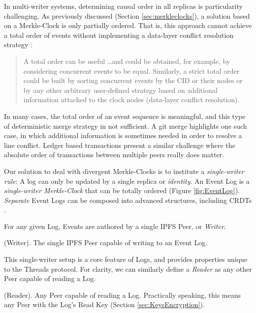 \documentclass{textile}
\begin{document}
In multi-writer systems, determining causal order in all replicas is particularity challenging. As previously discussed (Section \ref{sec:merkleclocks}), a solution based on a Merkle-Clock is only partially ordered. That is, this approach cannot achieve a total order of events without implementing a data-layer conflict resolution strategy \cite{sanjuanMerkleCRDTs2019}:

\begin{quote}
A total order can be useful \dots and could be obtained, for example, by considering concurrent events to be equal. Similarly, a strict total order could be built by sorting concurrent events by the CID or their nodes or by any other arbitrary user-defined strategy based on additional information attached to the clock nodes (data-layer conflict resolution).
\end{quote}

In many cases, the total order of an event sequence is meaningful, and this type of deterministic merge strategy in not sufficient. A git merge highlights one such case, in which additional information is sometimes needed in order to resolve a line conflict. Ledger based transactions present a similar challenge where the absolute order of transactions between multiple peers really does matter.

Our solution to deal with divergent Merkle-Clocks is to institute a \emph{single-writer rule}: A log can only be updated by a single replica or \emph{identity}. An Event Log is a \emph{single-writer Merkle-Clock} that can be totally ordered (Figure \ref{fig:EventLog}). \emph{Separate} Event Logs can be composed into advanced structures, including CRDTs \cite{enesSingleWriterPrincipleCRDT2017}.

For any given Log, Events are authored by a single IPFS Peer, or \emph{Writer}.

\begin{definition}
(Writer). The single IPFS Peer capable of writing to an Event Log.
\end{definition}

This single-writer setup is a core feature of Logs, and provides properties unique to the Threads protocol. For clarity, we can similarly define a \emph{Reader} as any other Peer capable of reading a Log.

\begin{definition}
(Reader). Any Peer capable of reading a Log. Practically speaking, this means any Peer with the Log's Read Key (Section  \ref{sec:KeysEncryption}).
\end{definition}
\end{document}
